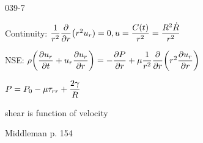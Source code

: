 \begin{mitframe}{039-7}


\begin{listone}

\item Continuity: $\dfrac{1}{\pos^2}\dfrac{\partial}{\partial\pos}\big(\pos^2\forcepot_{\pos})=0, \forcepot=\dfrac{\conc(t)}{\pos^2}=\dfrac{\gasconst^2\dot{\gasconst}}{\pos^2}$


\item NSE: $\dens\bigg(\dfrac{\partial\forcepot_{\pos}}{\partial{t}}+\forcepot_{\pos}\dfrac{\partial\forcepot_{\pos}}{\partial\pos}\bigg)=-\dfrac{\partial\p}{\partial\pos}+\chempot\dfrac{1}{\pos^2}\dfrac{\partial}{\partial\pos}\bigg(\pos^2\dfrac{\partial\forcepot_{\pos}}{\partial\pos}\bigg)$

				\begin{listtwo}
                
                \item $\p=\p_{0}-\chempot\torque_{\pos\pos}+\dfrac{2\gamma}{\gasconst}$
                
                
                \item shear is function of velocity
                
                \item Middleman p. 154
	
\end{listtwo}

\end{listone}
\end{mitframe}